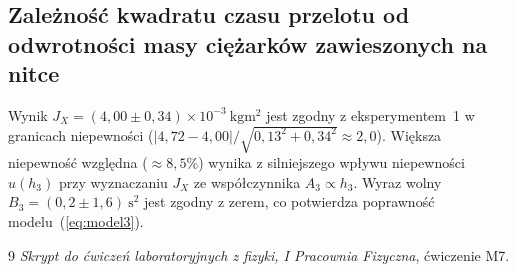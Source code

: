 \documentclass[12pt, a4paper]{article}
\begin{document}
\subsection{Zależność kwadratu czasu przelotu od odwrotności masy ciężarków zawieszonych na nitce}
Wynik $J_X = (4{,}00 \pm 0{,}34)\times10^{-3}\ \si{\kg\m\squared}$ jest zgodny z eksperymentem~1 w granicach niepewności ($|4{,}72 - 4{,}00|/\sqrt{0{,}13^2+0{,}34^2} \approx 2{,}0$). Większa niepewność względna (${\approx}8{,}5\%$) wynika z silniejszego wpływu niepewności $u(h_3)$ przy wyznaczaniu $J_X$ ze współczynnika $A_3 \propto h_3$. Wyraz wolny $B_3 = (0{,}2 \pm 1{,}6)\ \si{\s\squared}$ jest zgodny z zerem, co potwierdza poprawność modelu~(\ref{eq:model3}).

\begin{thebibliography}{9}
\textit{Skrypt do ćwiczeń laboratoryjnych z fizyki, I Pracownia Fizyczna}, ćwiczenie M7.
\end{thebibliography}
\end{document}
